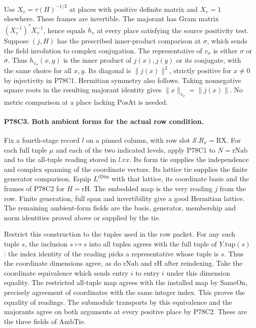 Use $X_v=\tau(H)^{-1/2}$ at places with positive definite
matrix and $X_v=1$ elsewhere. These frames are invertible.
The majorant has Gram matrix $(X_v^{-1})^* X_v^{-1}$, hence
equals $h_v$ at every place satisfying the source positivity test.
Suppose $(j,H)$ has the prescribed inner-product comparison at
$\sigma$, which sends the field involution to complex conjugation.
The representative of $v_\sigma$ is either $\sigma$ or
$\bar\sigma$. Thus $h_{v_\sigma}(x,y)$ is the inner product
of $j(x),j(y)$ or its conjugate, with the same choice for all
$x,y$. Its diagonal is $\|j(x)\|^2$, strictly positive for
$x\ne0$ by injectivity in P78C1. Hermitian symmetry also follows.
Taking nonnegative square roots in the resulting majorant identity
gives $\|x\|_{v_\sigma}=\|j(x)\|$. No metric comparison at
a place lacking $\mathrm{PosAt}$ is needed.

\paragraph{P78C3. Both ambient forms for the actual row condition.}
Fix a fourth-stage record $l$ on a pinned column, with row slot
$\mathcal S.R_x=\mathrm{RX}$. For each full tuple $\mu$ and each
of the two indicated levels, apply P78C1 to
$N=\mathrm{rNab}$ and to the all-tuple reading stored in $l.rx$.
Its form tie supplies the independence and complex spanning of the
coordinate vectors. Its lattice tie supplies the finite generator
comparison. Equip $L^{\mathrm{rDim}}$ with that lattice, its
coordinate basis and the frames of P78C2 for $H=\mathrm{rH}$.
The embedded map is the very reading $j$ from the row. Finite
generation, full span and invertibility give a good Hermitian
lattice. The remaining ambient-form fields are the basis, generator,
membership and norm identities proved above or supplied by the tie.

Restrict this construction to the tuples used in the row packet.
For any such tuple $s$, the inclusion $s\mapsto s$ into all tuples
agrees with the full tuple of $Y.\mathrm{tup}(s)$: the index
identity of the reading picks a representative whose tuple is $s$.
Thus the coordinate dimensions agree, as do $\mathrm{rNab}$ and
$\mathrm{rH}$ after reindexing. Take the coordinate equivalence
which sends entry $i$ to entry $i$ under this dimension equality.
The restricted all-tuple map agrees with the installed map by
$\mathrm{SameOn}$, precisely agreement of coordinates with the
same integer index. This proves the equality of readings. The
submodule transports by this equivalence and the majorants agree
on both arguments at every positive place by P78C2. These are
the three fields of $\mathrm{AmbTie}$.

